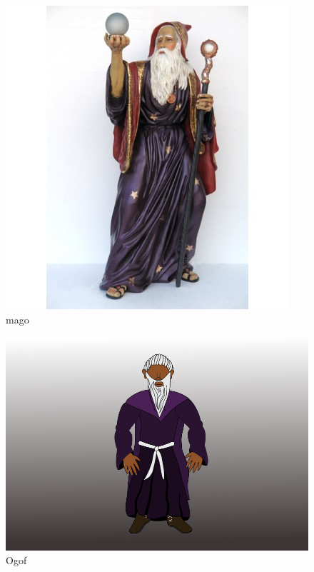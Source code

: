 \begin{figure}[htb]
	\caption{\label{mago}mago}
	\begin{center}
	    \includegraphics[width=\textwidth/2]{imagens/mago.jpg}
	\end{center}
\end{figure}

\begin{figure}[htb]
	\caption{\label{Ogof}Ogof}
	\begin{center}
	    \includegraphics[width=\textwidth/2]{imagens/Ogof.jpg}
	\end{center}
\end{figure}

